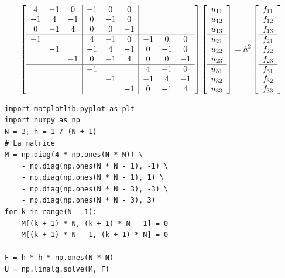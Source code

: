 \documentclass{beamer}
\begin{document}
 \begin{frame}  
 \[
\left[\begin{array}{ccc|ccc|ccc}
4&-1&0&-1&0&0\\
-1&4&-1&0&-1&0\\
0&-1&4&0&0&-1\\  \hline
-1&&&4&-1&0&-1&0&0\\
&-1&&-1&4&-1&0&-1&0\\
&&-1&0&-1&4&0&0&-1\\  \hline
&&&-1&&&4&-1&0\\
&&&&-1&&-1&4&-1\\
&&&&&-1&0&-1&4
\end{array}\right]
\left[\begin{array}{c}
u_{11}\\u_{12}\\ u_{13} \\  \hline
u_{21}\\u_{22}\\ u_{23} \\  \hline
u_{31}\\u_{32}\\ u_{33}
\end{array}\right] =h^2\left[\begin{array}{c}
f_{11}\\f_{12}\\ f_{13} \\ \hline
 f_{21}\\f_{22}\\ f_{23} \\  \hline
 f_{31}\\f_{32}\\ f_{33}
\end{array}\right]
\] 
 
\end{frame}



\begin{frame}[fragile] 
\begin{verbatim}
import matplotlib.pyplot as plt
import numpy as np
N = 3; h = 1 / (N + 1)
# La matrice
M = np.diag(4 * np.ones(N * N)) \
    - np.diag(np.ones(N * N - 1), -1) \
    - np.diag(np.ones(N * N - 1), 1) \
    - np.diag(np.ones(N * N - 3), -3) \
    - np.diag(np.ones(N * N - 3), 3)
for k in range(N - 1):
    M[(k + 1) * N, (k + 1) * N - 1] = 0
    M[(k + 1) * N - 1, (k + 1) * N] = 0

F = h * h * np.ones(N * N)
U = np.linalg.solve(M, F)
\end{verbatim}
 

 \end{frame}
\end{document}
